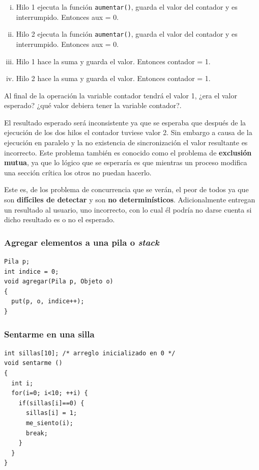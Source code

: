 \begin{enumerate}[i.]

	\item Hilo 1 ejecuta la función \texttt{aumentar()}, guarda el
	valor del contador y es interrumpido. Entonces aux = 0.

	\item Hilo 2 ejecuta la función \texttt{aumentar()}, guarda el
	valor del contador y es interrumpido. Entonces aux = 0.

	\item Hilo 1 hace la suma y guarda el valor. Entonces contador = 1.

	\item Hilo 2 hace la suma y guarda el valor. Entonces contador = 1.

\end{enumerate}

Al final de la operación la variable contador tendrá el valor 1, ¿era el valor
esperado? ¿qué valor debiera tener la variable contador?.

El resultado esperado será inconsistente ya que se esperaba que después de la
ejecución de los dos hilos el contador tuviese valor 2. Sin embargo a causa de
la ejecución en paralelo y la no existencia de sincronización el valor
resultante es incorrecto. Este problema también es conocido como el problema de
\textbf{exclusión mutua}, ya que lo lógico que se esperaría es que mientras un
proceso modifica una sección crítica los otros no puedan hacerlo.

Este es, de los problema de concurrencia que se verán, el peor de todos ya que
son \textbf{difíciles de detectar} y son \textbf{no determinísticos}.
Adicionalmente entregan un resultado al usuario, uno incorrecto, con lo cual él
podría no darse cuenta si dicho resultado es o no el esperado.

\subsubsection{Agregar elementos a una pila o \textit{stack}}
\begin{lstlisting}
Pila p;
int indice = 0;
void agregar(Pila p, Objeto o)
{
  put(p, o, indice++);
}
\end{lstlisting}

\subsubsection{Sentarme en una silla}
\begin{lstlisting}
int sillas[10]; /* arreglo inicializado en 0 */
void sentarme ()
{
  int i;
  for(i=0; i<10; ++i) {
    if(sillas[i]==0) {
      sillas[i] = 1;
      me_siento(i);
      break;
    }
  }
}
\end{lstlisting}

